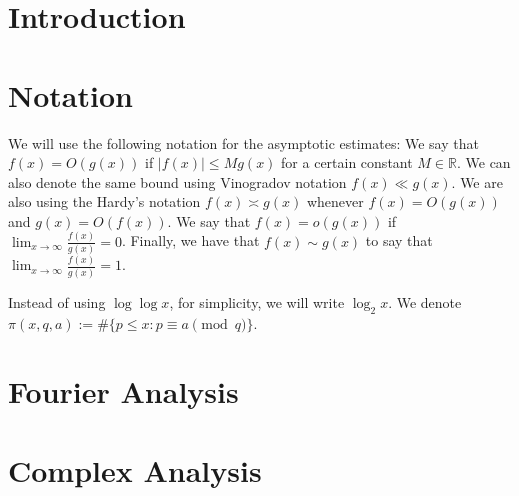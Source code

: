 \chapter*{Introduction}
\chapter*{Notation}
We will use the following notation for the asymptotic estimates: We say that $f(x) = O(g(x))$ if $|f(x)| \leq M g(x)$ for a certain constant $M \in \mathbb{R}$. We can also denote the same bound using Vinogradov notation $f(x)\ll g(x)$. We are also using the Hardy's notation $f(x) \asymp g(x)$ whenever $f(x) = O(g(x))$ and $g(x) = O(f(x))$. We say that $f(x) = o(g(x))$ if $\lim_{x \to \infty} \frac{f(x)}{g(x)} = 0$. Finally, we have that $f(x) \sim g(x)$ to say that $\lim_{x \to \infty} \frac{f(x)}{g(x)}=1 $.

Instead of using $\log \log x $, for simplicity, we will write $\log_2 x$. We denote $\pi(x,q,a):=\#\{p\le x: p \equiv a \pmod q\}$.






\begin{appendices}
\chapter{Fourier Analysis}
\chapter{Complex Analysis}
\end{appendices}


